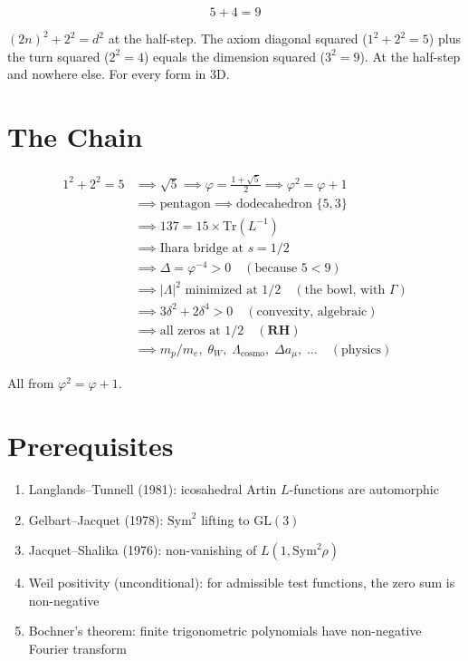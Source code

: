 \documentclass[12pt,a4paper]{article}
\begin{document}
\begin{equation}
\boxed{5 + 4 = 9}
\end{equation}

$(2n)^2 + 2^2 = d^2$ at the half-step. The axiom diagonal squared ($1^2 + 2^2 = 5$) plus the turn squared ($2^2 = 4$) equals the dimension squared ($3^2 = 9$). At the half-step and nowhere else. For every form in 3D.

\section{The Chain}

\begin{align*}
1^2 + 2^2 = 5 &\implies \sqrt{5} \implies \varphi = \frac{1+\sqrt{5}}{2} \implies \varphi^2 = \varphi + 1 \\
&\implies \text{pentagon} \implies \text{dodecahedron } \{5,3\} \\
&\implies 137 = 15 \times \mathrm{Tr}(L^{-1}) \\
&\implies \text{Ihara bridge at } s = 1/2 \\
&\implies \Delta = \varphi^{-4} > 0 \quad (\text{because } 5 < 9) \\
&\implies |\Lambda|^2 \text{ minimized at } 1/2 \quad (\text{the bowl, with } \Gamma) \\
&\implies 3\delta^2 + 2\delta^4 > 0 \quad (\text{convexity, algebraic}) \\
&\implies \text{all zeros at } 1/2 \quad (\textbf{RH}) \\
&\implies m_p/m_e,\; \theta_W,\; \Lambda_{\mathrm{cosmo}},\; \Delta a_\mu,\; \ldots \quad (\text{physics})
\end{align*}

All from $\varphi^2 = \varphi + 1$.

\section{Prerequisites}

\begin{enumerate}
\item Langlands--Tunnell (1981): icosahedral Artin $L$-functions are automorphic
\item Gelbart--Jacquet (1978): $\mathrm{Sym}^2$ lifting to $\mathrm{GL}(3)$
\item Jacquet--Shalika (1976): non-vanishing of $L(1, \mathrm{Sym}^2\rho)$
\item Weil positivity (unconditional): for admissible test functions, the zero sum is non-negative
\item Bochner's theorem: finite trigonometric polynomials have non-negative Fourier transform
\end{enumerate}
\end{document}
